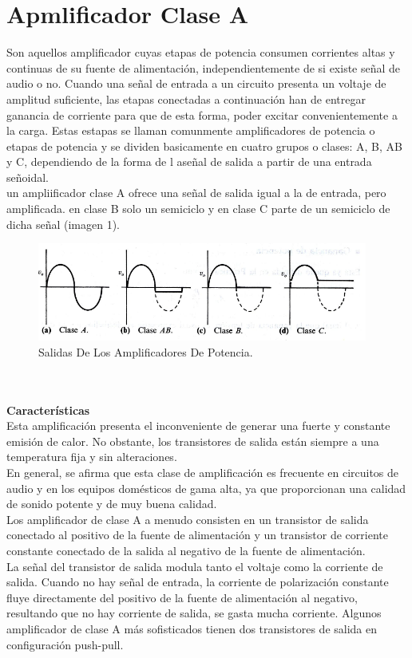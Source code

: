 \documentclass[10pt,a4paper]{article}
\begin{document}
\section{Apmlificador Clase A}
Son aquellos amplificador cuyas etapas de potencia consumen corrientes altas y continuas de su fuente de alimentación, independientemente de si existe señal de audio o no.
Cuando una señal de entrada a un circuito presenta un voltaje de amplitud suficiente, las etapas conectadas a continuación han de entregar ganancia de corriente para que de esta forma, poder excitar convenientemente a la carga. Estas estapas se llaman comunmente amplificadores de potencia o etapas de potencia y se dividen basicamente en cuatro grupos o clases: A, B, AB y C, dependiendo de la forma de l aseñal de salida a partir de una entrada señoidal.\\
un ampliificador clase A ofrece una señal de salida igual a la de entrada, pero amplificada. en clase B solo un semiciclo y en clase C parte de un semiciclo de dicha señal (imagen 1). \\
\begin{figure}[hbtp]
\centering
\includegraphics[scale=1]{clase.png}
\caption{Salidas De Los Amplificadores De Potencia.}
\end{figure}\\\\
\textbf{Características}\\
Esta amplificación presenta el inconveniente de generar una fuerte y constante emisión de calor. No obstante, los transistores de salida están siempre a una temperatura fija y sin alteraciones.\\
En general, se afirma que esta clase de amplificación es frecuente en circuitos de audio y en los equipos domésticos de gama alta, ya que proporcionan una calidad de sonido potente y de muy buena calidad.\\
Los amplificador de clase A a menudo consisten en un transistor de salida conectado al positivo de la fuente de alimentación y un transistor de corriente constante conectado de la salida al negativo de la fuente de alimentación.\\
La señal del transistor de salida modula tanto el voltaje como la corriente de salida. Cuando no hay señal de entrada, la corriente de polarización constante fluye directamente del positivo de la fuente de alimentación al negativo, resultando que no hay corriente de salida, se gasta mucha corriente. Algunos amplificador de clase A más sofisticados tienen dos transistores de salida en configuración push-pull.\\\\\\
\end{document}
